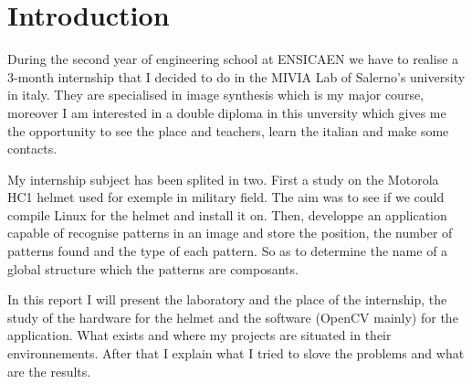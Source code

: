 \chapter{Introduction}

\par During the second year of engineering school at ENSICAEN we have to realise a 3-month internship that I decided to do in the MIVIA Lab of Salerno's university in italy. They are specialised in image synthesis which is my major course, moreover I am interested in a double diploma in this unversity which gives me the opportunity to see the place and teachers, learn the italian and make some contacts.
\par My internship subject has been splited in two. First a study on the Motorola HC1 helmet used for exemple in military field. The aim was to see if we could compile Linux for the helmet and install it on. Then, developpe an application capable of recognise patterns in an image and store the position, the number of patterns found and the type of each pattern. So as to determine the name of a global structure which the patterns are composants.
\par In this report I will present the laboratory and the place of the internship, the study of the hardware for the helmet and the software (OpenCV mainly) for the application. What exists and where my projects are situated in their environnements. After that I explain what I tried to slove the problems and what are the results.